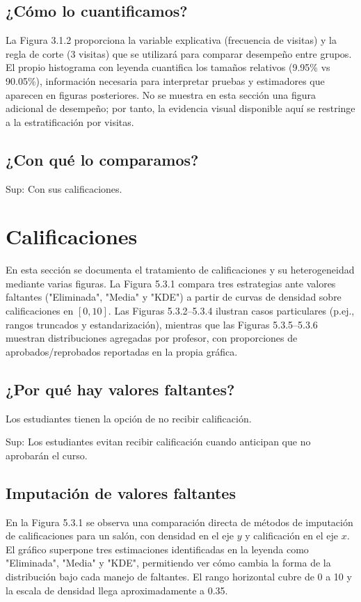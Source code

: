 \documentclass[8pt,a4paper]{article} %
\numberwithin{figure}{subsection}
\begin{document}
\subsection{\texorpdfstring{¿Cómo lo cuantificamos?}{Como lo cuantificamos?}}
La Figura 3.1.2 proporciona la variable explicativa (frecuencia de visitas) y la regla de corte (3 visitas) que se utilizará para comparar desempeño entre grupos.
El propio histograma con leyenda cuantifica los tamaños relativos (9.95\% vs 90.05\%), información necesaria para interpretar pruebas y estimadores que aparecen en figuras posteriores.
No se muestra en esta sección una figura adicional de desempeño; por tanto, la evidencia visual disponible aquí se restringe a la estratificación por visitas.

\subsection{\texorpdfstring{¿Con qué lo comparamos?}{Con que lo comparamos?}}
Sup: Con sus calificaciones.


\newpage
\section{Calificaciones}
En esta sección se documenta el tratamiento de calificaciones y su heterogeneidad mediante varias figuras.
La Figura 5.3.1 compara tres estrategias ante valores faltantes ("Eliminada", "Media" y "KDE") a partir de curvas de densidad sobre calificaciones en $[0,10]$.
Las Figuras 5.3.2--5.3.4 ilustran casos particulares (p.ej., rangos truncados y estandarización), mientras que las Figuras 5.3.5--5.3.6 muestran distribuciones agregadas por profesor, con proporciones de aprobados/reprobados reportadas en la propia gráfica.


\subsection{\texorpdfstring{¿Por qué hay valores faltantes?}{Por que hay valores faltantes?}}
Los estudiantes tienen la opción de no recibir calificación.

Sup: Los estudiantes evitan recibir calificación cuando anticipan que no aprobarán el curso.

\subsection{Imputación de valores faltantes}
En la Figura 5.3.1 se observa una comparación directa de métodos de imputación de calificaciones para un salón, con densidad en el eje $y$ y calificación en el eje $x$.
El gráfico superpone tres estimaciones identificadas en la leyenda como "Eliminada", "Media" y "KDE", permitiendo ver cómo cambia la forma de la distribución bajo cada manejo de faltantes.
El rango horizontal cubre de 0 a 10 y la escala de densidad llega aproximadamente a 0.35.
\end{document}
